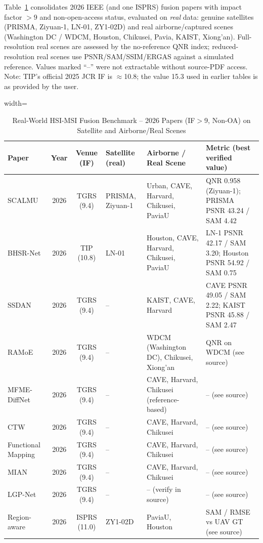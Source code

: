 \documentclass[conference]{IEEEtran}
\begin{document}
Table~\ref{tab:realworld} consolidates 2026 IEEE (and one ISPRS) fusion papers with impact
factor $>9$ and non-open-access status, evaluated on \emph{real} data: genuine satellites
(PRISMA, Ziyuan-1, LN-01, ZY1-02D) and real airborne/captured scenes (Washington DC / WDCM,
Houston, Chikusei, Pavia, KAIST, Xiong'an). Full-resolution real scenes are assessed by the
no-reference QNR index; reduced-resolution real scenes use PSNR/SAM/SSIM/ERGAS against a
simulated reference. Values marked ``--'' were not extractable without source-PDF access.
Note: TIP's official 2025 JCR IF is $\approx$10.8; the value 15.3 used in earlier tables is
as provided by the user.

\begin{table}[htbp]
\caption{Real-World HSI-MSI Fusion Benchmark -- 2026 Papers (IF$>$9, Non-OA) on Satellite and Airborne/Real Scenes}
\label{tab:realworld}
\begin{center}
\begin{adjustbox}{width=\textwidth}
\begin{tabular}{p{3.5cm}c|c|p{2.3cm}|p{3.0cm}|p{3.8cm}}
\toprule
\textbf{Paper} & \textbf{Year} & \textbf{Venue (IF)} & \textbf{Satellite (real)} & \textbf{Airborne / Real Scene} & \textbf{Metric (best verified value)} \\
\midrule
SCALMU \cite{xu2026scalmu} & 2026 & TGRS (9.4) & PRISMA, Ziyuan-1 & Urban, CAVE, Harvard, Chikusei, PaviaU & QNR 0.958 (Ziyuan-1); PRISMA PSNR 43.24 / SAM 4.42 \\
BHSR-Net \cite{dou2026bhsrnet} & 2026 & TIP (10.8) & LN-01 & Houston, CAVE, Harvard, Chikusei, PaviaU & LN-1 PSNR 42.17 / SAM 3.20; Houston PSNR 54.92 / SAM 0.75 \\
SSDAN \cite{ssdan2026} & 2026 & TGRS (9.4) & -- & KAIST, CAVE, Harvard & CAVE PSNR 49.05 / SAM 2.22; KAIST PSNR 45.88 / SAM 2.47 \\
RAMoE \cite{ramoe2026} & 2026 & TGRS (9.4) & -- & WDCM (Washington DC), Chikusei, Xiong'an & QNR on WDCM (see source) \\
MFME-DiffNet \cite{mfme2026} & 2026 & TGRS (9.4) & -- & CAVE, Harvard, Chikusei (reference-based) & -- (see source) \\
CTW \cite{coupled2026} & 2026 & TGRS (9.4) & -- & CAVE, Harvard, Chikusei & -- (see source) \\
Functional Mapping \cite{functional2026} & 2026 & TGRS (9.4) & -- & CAVE, Harvard, Chikusei & -- (see source) \\
MIAN \cite{huo2026modal} & 2026 & TGRS (9.4) & -- & CAVE, Harvard, Chikusei & -- (see source) \\
LGP-Net \cite{lgpnet2026} & 2026 & TGRS (9.4) & -- & -- (verify in source) & -- (see source) \\
Region-aware \cite{yu2026region} & 2026 & ISPRS (11.0) & ZY1-02D & PaviaU, Houston & SAM / RMSE vs UAV GT (see source) \\
\bottomrule
\end{tabular}
\end{adjustbox}
\end{center}
\end{table}
\end{document}
